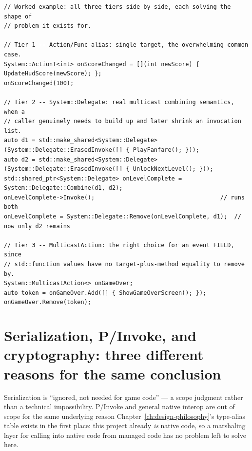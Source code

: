 \begin{lstlisting}
// Worked example: all three tiers side by side, each solving the shape of
// problem it exists for.

// Tier 1 -- Action/Func alias: single-target, the overwhelming common case.
System::ActionT<int> onScoreChanged = [](int newScore) { UpdateHudScore(newScore); };
onScoreChanged(100);

// Tier 2 -- System::Delegate: real multicast combining semantics, when a
// caller genuinely needs to build up and later shrink an invocation list.
auto d1 = std::make_shared<System::Delegate>(System::Delegate::ErasedInvoke([] { PlayFanfare(); }));
auto d2 = std::make_shared<System::Delegate>(System::Delegate::ErasedInvoke([] { UnlockNextLevel(); }));
std::shared_ptr<System::Delegate> onLevelComplete = System::Delegate::Combine(d1, d2);
onLevelComplete->Invoke();                                    // runs both
onLevelComplete = System::Delegate::Remove(onLevelComplete, d1);  // now only d2 remains

// Tier 3 -- MulticastAction: the right choice for an event FIELD, since
// std::function values have no target-plus-method equality to remove by.
System::MulticastAction<> onGameOver;
auto token = onGameOver.Add([] { ShowGameOverScreen(); });
onGameOver.Remove(token);
\end{lstlisting}

\section{Serialization, P/Invoke, and cryptography: three different reasons for the same conclusion}

Serialization is ``ignored, not needed for game code'' --- a scope judgment rather than a
technical impossibility. P/Invoke and general native interop are out of scope for the same
underlying reason Chapter~\ref{ch:design-philosophy}'s type-alias table exists in the first
place: this project already \emph{is} native code, so a marshaling layer for calling into
native code from managed code has no problem left to solve here.

